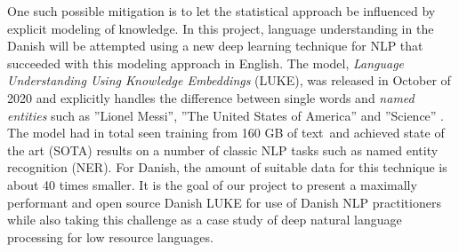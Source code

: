 \documentclass[main.tex]{subfiles}
\begin{document}
One such possible mitigation is to let the statistical approach be influenced by explicit modeling of knowledge.
In this project, language understanding in the Danish will be attempted using a new deep learning technique for NLP that succeeded with this modeling approach in English.
The model, \emph{Language Understanding Using Knowledge Embeddings} (LUKE), was released in October of 2020 and explicitly handles the difference between single words and \emph{named entities} such as ''Lionel Messi'', ''The United States of America'' and ''Science'' \cite{yamada2020luke}.
The model had in total seen training from 160 GB of text\footnotemark~and achieved state of the art (SOTA) results on a number of classic NLP tasks such as named entity recognition (NER).
For Danish, the amount of suitable data for this technique is about 40 times smaller\footnotemark.
It is the goal of our project to present a maximally performant and open source Danish LUKE for use of Danish NLP practitioners while also taking this challenge as a case study of deep natural language processing for low resource languages.
\end{document}
